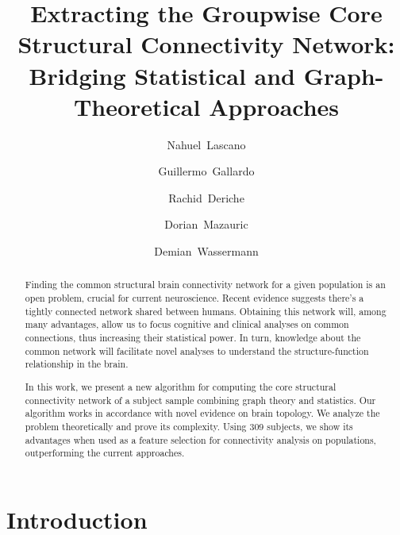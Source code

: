 \documentclass[runningheads,a4paper]{llncs}
\begin{document}
\mainmatter  %

\title{Extracting the Groupwise Core Structural Connectivity Network: Bridging Statistical and Graph-Theoretical Approaches}

\author{\vspace{-2cm}}
\institute{\vspace{-1px}}

\author{Nahuel~Lascano 
    \and Guillermo~Gallardo
    \and Rachid~Deriche
    \and Dorian~Mazauric
    \and Demian~Wassermann}

\maketitle

\begin{abstract}
Finding the common structural brain connectivity network for a given population is an open problem, crucial for current neuroscience. Recent evidence suggests there's a tightly connected network shared between humans. Obtaining this network will, among many advantages, allow us to focus cognitive and clinical analyses on common connections, thus increasing their statistical power. In turn, knowledge about the common network will facilitate novel analyses to understand the structure-function relationship in the brain.

In this work, we present a new algorithm for computing the core structural connectivity network of a subject sample combining graph theory and statistics. Our algorithm works in accordance with novel evidence on brain topology. We analyze the problem theoretically and prove its complexity. Using 309 subjects, we show its advantages when used as a feature selection for connectivity analysis on populations, outperforming the current approaches.

\end{abstract}

\section{Introduction}

\end{document}

